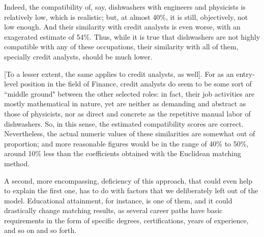 \documentclass{article}
\begin{document}
Indeed, the compatibility of, say, dishwashers with engineers and physicists is
relatively low, which is realistic; but, at almost 40\%, it is still,
objectively, not low enough. And their similarity with credit analysts is even
worse, with an exagerated estimate of 54\%. Thus, while it is true that
dishwashers are not highly compatible with any of these occupations, their
similarity with all of them, specially credit analysts, should be much lower.

[To a lesser extent, the same applies to credit analysts, as well]. For as an
entry-level position in the field of Finance, credit analysts do seem to be
some sort of ``middle ground" between the other selected roles: in fact, their
job activities are mostly mathematical in nature, yet are neither as demanding
and abstract as those of physicists, nor as direct and concrete as the
repetitive manual labor of dishwashers. So, in this sense, the estimated
compatibility scores are correct. Nevertheless, the actual numeric values of
these similarities are somewhat out of proportion; and more reasonable figures
would be in the range of 40\% to 50\%, around 10\% less than the coefficients
obtained with the Euclidean matching method.


A second, more encompassing, deficiency of this approach, that could even help
to explain the first one, has to do with factors that we deliberately left out
of the model. Educational attainment, for instance, is one of them, and it
could drastically change matching results, as several career paths have basic
requirements in the form of specific degrees, certifications, years of
experience, and so on and so forth.
\end{document}
